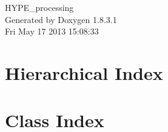 \documentclass{book}
\begin{document}
\hypersetup{pageanchor=false,citecolor=blue}
\begin{titlepage}
\vspace*{7cm}
\begin{center}
{\Large H\-Y\-P\-E\-\_\-processing }\\
\vspace*{1cm}
{\large Generated by Doxygen 1.8.3.1}\\
\vspace*{0.5cm}
{\small Fri May 17 2013 15:08:33}\\
\end{center}
\end{titlepage}
\clearemptydoublepage
{}
\tableofcontents
\clearemptydoublepage
{}
\hypersetup{pageanchor=true,citecolor=blue}
\chapter{Hierarchical Index}

\chapter{Class Index}

\end{document}
